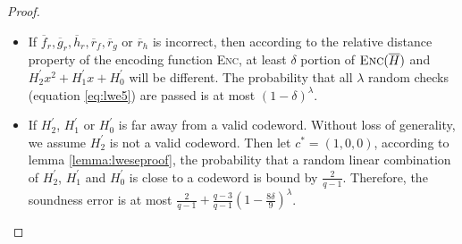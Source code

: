 \begin{proof}
\begin{itemize}
    \item If $\overline{f}_r, \overline{g}_r, \overline{h}_r, \overline{r}_f, \overline{r}_g$ or $\overline{r}_h$ is incorrect, then according to the relative distance property of the encoding function \textsc{Enc}, at least $\delta$ portion of $\textsc{Enc}(\overline{H})$ and $H_2^\prime x^2 + H_1^\prime x + H_0^\prime$ will be different. The probability that all $\lambda$ random checks (equation \ref{eq:lwe5}) are passed is at most $(1 - \delta)^\lambda$.
    
    \item If $H_2^\prime$, $H_1^\prime$ or $H_0^\prime$ is far away from a valid codeword. Without loss of generality, we assume $H_2^\prime$ is not a valid codeword. Then let $c^* = (1, 0, 0)$, according to lemma \ref{lemma:lweseproof}, the probability that a random linear combination of $H_2^\prime$, $H_1^\prime$ and $H_0^\prime$ is close to a codeword is bound by $\frac{2}{q-1}$. Therefore, the soundness error is at most $\frac{2}{q-1} + \frac{q-3}{q-1}(1 - \frac{8\delta}{9})^\lambda$.
\end{itemize}


\end{proof}

